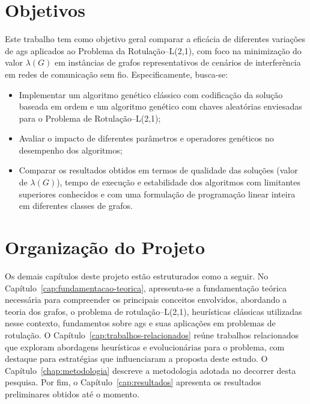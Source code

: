 \section{Objetivos}\label{sec:objetivos}
Este trabalho tem como objetivo geral comparar a eficácia de diferentes variações de \gls{ag}s aplicados ao Problema da Rotulação–L(2,1), com foco na minimização do valor $\lambda(G)$ em instâncias de grafos representativos de cenários de interferência em redes de comunicação sem fio. Especificamente, busca-se:

\begin{itemize}

    \item Implementar um algoritmo genético clássico com codificação da solução baseada em ordem e um  algoritmo genético com chaves aleatórias enviesadas para o Problema de Rotulação–L(2,1);
    \item Avaliar o impacto de diferentes parâmetros e operadores genéticos no desempenho dos algoritmos;
    \item Comparar os resultados obtidos em termos de qualidade das soluções (valor de $\lambda(G)$), tempo de execução e estabilidade dos algoritmos com limitantes superiores conhecidos e com uma formulação de programação linear inteira em diferentes classes de grafos.

\end{itemize}

\section{Organização do Projeto}\label{sec:organização-do-trabalho}

Os demais capítulos deste projeto  estão estruturados como a seguir. No Capítulo~\ref{cap:fundamentacao-teorica}, apresenta-se a fundamentação teórica necessária para compreender os principais conceitos envolvidos, abordando a teoria dos grafos, o problema de rotulação–L(2,1), heurísticas clássicas utilizadas nesse contexto, fundamentos sobre \gls{ag}s e suas aplicações em problemas de rotulação. O Capítulo~\ref{cap:trabalhos-relacionados} reúne trabalhos relacionados que exploram abordagens heurísticas e evolucionárias para o problema, com destaque para estratégias que influenciaram a proposta deste estudo. O Capítulo~\ref{chap:metodologia} descreve a metodologia adotada no decorrer desta pesquisa. Por fim, o Capítulo~\ref{cap:resultados} apresenta os resultados preliminares obtidos até o momento.